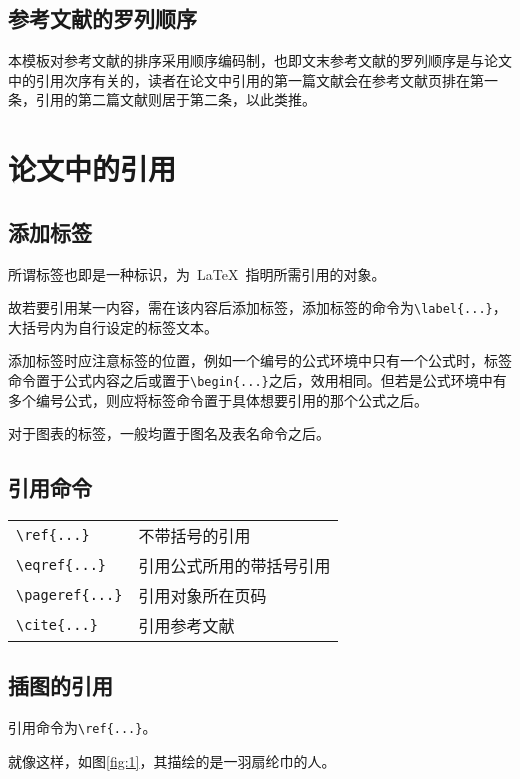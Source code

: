 \subsection{参考文献的罗列顺序}

本模板对参考文献的排序采用顺序编码制，也即文末参考文献的罗列顺序是与论文中的引用次序有关的，读者在论文中引用的第一篇文献会在参考文献页排在第一条，引用的第二篇文献则居于第二条，以此类推。

\section{论文中的引用}

\subsection{添加标签}

所谓标签也即是一种标识，为~\LaTeX~指明所需引用的对象。

故若要引用某一内容，需在该内容后添加标签，添加标签的命令为\verb|\label{...}|，大括号内为自行设定的标签文本。

添加标签时应注意标签的位置，例如一个编号的公式环境中只有一个公式时，标签命令置于公式内容之后或置于\verb|\begin{...}|之后，效用相同。但若是公式环境中有多个编号公式，则应将标签命令置于具体想要引用的那个公式之后。

对于图表的标签，一般均置于图名及表名命令之后。

\subsection{引用命令}

\begin{tabular}{l l}
  \verb|\ref{...}|   & 不带括号的引用 \\
  \verb|\eqref{...}|  & 引用公式所用的带括号引用 \\
  \verb|\pageref{...}| & 引用对象所在页码 \\
  \verb|\cite{...}| & 引用参考文献 
\end{tabular}

\subsection{插图的引用}

引用命令为\verb|\ref{...}|。

就像这样，如图\ref{fig:1}，其描绘的是一羽扇纶巾的人。\par 


